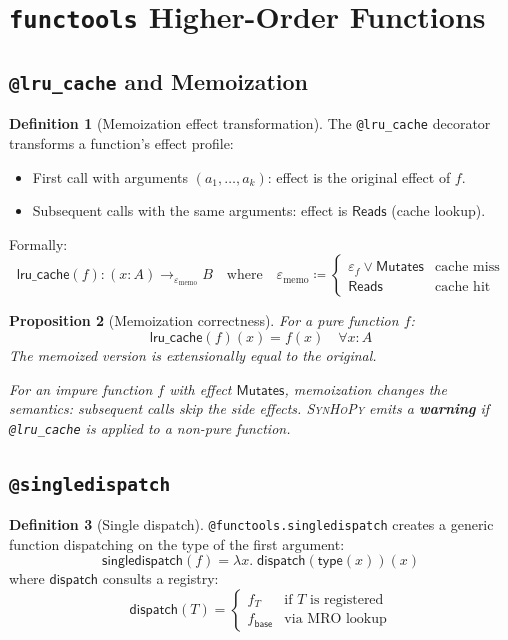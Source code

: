\documentclass[11pt,a4paper]{report}
\theoremstyle{definition}
\newtheorem{definition}{Definition}[chapter]
\theoremstyle{plain}
\newtheorem{proposition}[definition]{Proposition}
\newcommand{\defeq}{\coloneqq}
\newcommand{\Reads}{\mathsf{Reads}}
\newcommand{\Mutates}{\mathsf{Mutates}}
\newcommand{\synhopy}{\textsc{SynHoPy}}
\begin{document}
\section{\texttt{functools} Higher-Order Functions}

\subsection{\texttt{@lru\_cache} and Memoization}

\begin{definition}[Memoization effect transformation]
The \lstinline[style=python]{@lru_cache} decorator transforms a function's effect profile:
\begin{itemize}
  \item First call with arguments $(a_1, \ldots, a_k)$: effect is the original effect of $f$.
  \item Subsequent calls with the same arguments: effect is $\Reads$ (cache lookup).
\end{itemize}
Formally:
\[
  \mathsf{lru\_cache}(f) : (x : A) \to_{\varepsilon_{\mathrm{memo}}} B
  \quad\text{where}\quad
  \varepsilon_{\mathrm{memo}} \defeq \begin{cases}
    \varepsilon_f \vee \Mutates & \text{cache miss} \\
    \Reads & \text{cache hit}
  \end{cases}
\]
\end{definition}

\begin{proposition}[Memoization correctness]
For a pure function $f$:
\[
  \mathsf{lru\_cache}(f)(x) = f(x) \quad \forall x : A
\]
The memoized version is extensionally equal to the original.

For an impure function $f$ with effect $\Mutates$, memoization changes
the semantics: subsequent calls skip the side effects.  \synhopy{} emits a
\textbf{warning} if \lstinline[style=python]{@lru_cache} is applied to a
non-pure function.
\end{proposition}

\subsection{\texttt{@singledispatch}}

\begin{definition}[Single dispatch]
\lstinline[style=python]{@functools.singledispatch} creates a generic function
dispatching on the type of the first argument:
\[
  \mathsf{singledispatch}(f) = \lambda x.\; \mathsf{dispatch}(\mathsf{type}(x))(x)
\]
where $\mathsf{dispatch}$ consults a registry:
\[
  \mathsf{dispatch}(T) = \begin{cases}
    f_T & \text{if } T \text{ is registered} \\
    f_{\mathsf{base}} & \text{via MRO lookup}
  \end{cases}
\]
\end{definition}
\end{document}
